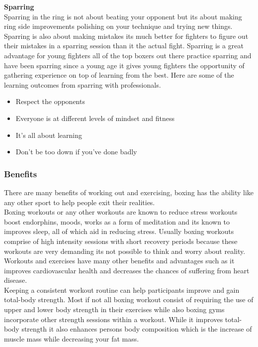 \documentclass[a4paper,12pt]{report}
\begin{document}
\textbf{Sparring}\\
Sparring in the ring is not about beating your opponent but its about making ring side improvements polishing on your technique and trying new things. Sparring is also about making mistakes its much better for fighters to figure out their mistakes in a sparring session than it the actual fight.  
Sparring is a great advantage for young fighters all of the top boxers out there practice sparring and have been sparring since a young age it gives young fighters the opportunity of gathering experience on top of learning from the best. 
Here are some of the learning outcomes from sparring with professionals.\cite{sparringWorkout}
\begin{itemize}
    \item Respect the opponents
    \item Everyone is at different levels of mindset and fitness
    \item It’s all about learning
    \item Don’t be too down if you’ve done badly
\end{itemize}

\subsubsection{Benefits}
There are many benefits of working out and exercising, boxing has the ability like any other sport to help people exit their realities.\\
Boxing workouts or any other workouts are known to reduce stress workouts boost endorphins,  moods, works as a form of meditation and its known to improves sleep, all of which aid in reducing stress.
Usually boxing workouts comprise of high intensity sessions with short recovery periods because these workouts are very demanding its not possible to think and worry about reality.\\

Workouts and exercises have many other benefits and advantages such as it improves cardiovascular health and decreases the chances of suffering from heart disease.\\

Keeping a consistent workout routine can help participants improve and gain total-body strength. Most if not all boxing workout consist of requiring the use of upper and lower body strength in their exercises while also boxing gyms incorporate other strength sessions within a workout. While it improves total-body strength it also enhances persons body composition which is the increase of muscle mass while decreasing your fat mass.\cite{workoutBenifits}   
\newpage
\end{document}
